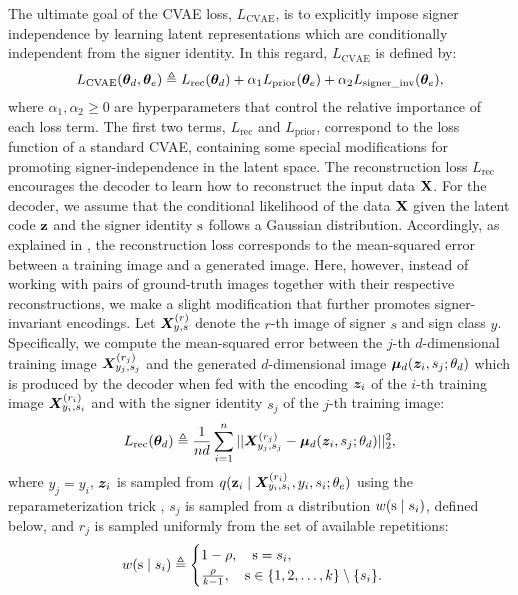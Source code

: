The ultimate goal of the CVAE loss, $L_{\text{CVAE}}$, is to explicitly impose signer independence by learning latent representations which are conditionally independent from the signer identity. In this regard, $L_{\text{CVAE}}$ is defined by:
\begin{equation}
    L_{\text{CVAE}}({\bm{\theta}}_{d},{\bm{\theta}}_{e}) \triangleq L_{\text{rec}}({\bm{\theta}}_{d}) + \alpha_{1} L_{\text{prior}}({\bm{\theta}}_{e}) + \alpha_{2} L_{\text{signer\_inv}}({\bm{\theta}}_{e}),
\end{equation}
where $\alpha_{1},\alpha_{2}\geq 0$ are hyperparameters that control the relative importance of each loss term. The first two terms, $L_{\text{rec}}$ and $L_{\text{prior}}$, correspond to the loss function of a standard CVAE, containing some special modifications for promoting signer-independence in the latent space. The reconstruction loss $L_{\text{rec}}$ encourages the decoder to learn how to reconstruct the input data ${\mathbf{X}}$. For the decoder, we assume that the conditional likelihood of the data ${\mathbf{X}}$ given the latent code ${\mathbf{z}}$ and the signer identity ${\textnormal{s}}$ follows a Gaussian distribution. Accordingly, as explained in , the reconstruction loss corresponds to the mean-squared error between a training image and a generated image. Here, however, instead of working with pairs of ground-truth images together with their respective reconstructions, we make a slight modification that further promotes signer-invariant encodings. Let ${\bm{X}}^{(r)}_{y,s}$ denote the $r$-th image of signer $s$ and sign class $y$. Specifically, we compute the mean-squared error between the $j$-th $d$-dimensional training image ${\bm{X}}^{(r_{j})}_{y_{j},s_{j}}$ and the generated $d$-dimensional image ${\bm{\mu}}_d({\bm{z}}_{i},s_{j}; \theta_{d})$ which is produced by the decoder when fed with the encoding ${\bm{z}}_{i}$ of the $i$-th training image ${\bm{X}}^{(r_{i})}_{y_{i},s_{i}}$ and with the signer identity $s_j$ of the $j$-th training image:
\begin{equation}
    \label{eq:loss_rec}
    L_{\text{rec}}({\bm{\theta}}_{d}) \triangleq \frac{1}{n d} \sum_{i=1}^{n}||{\bm{X}}^{(r_{j})}_{y_{j},s_{j}}-{\bm{\mu}}_d({\bm{z}}_{i},s_{j}; \theta_{d})||^2_2,
\end{equation}
where $y_{j}=y_{i}$, ${\bm{z}}_{i}$ is sampled from $q({\mathbf{z}}_{i} \mid {\bm{X}}^{(r_{i})}_{y_{i},s_{i}}, y_{i}, s_{i}; \theta_e)$ using the reparameterization trick , $s_{j}$ is sampled from a distribution $w({\textnormal{s}} \mid s_{i})$, defined below, and $r_{j}$ is sampled uniformly from the set of available repetitions:
\begin{equation}
    w({\textnormal{s}} \mid s_{i}) \triangleq
    \begin{cases}
        1-\rho, \quad {\textnormal{s}}=s_{i}, \\
        \frac{\rho}{k-1}, \quad {\textnormal{s}} \in \{1,2,\dots,k\} \setminus \lbrace s_{i} \rbrace.
    \end{cases}
\end{equation}
